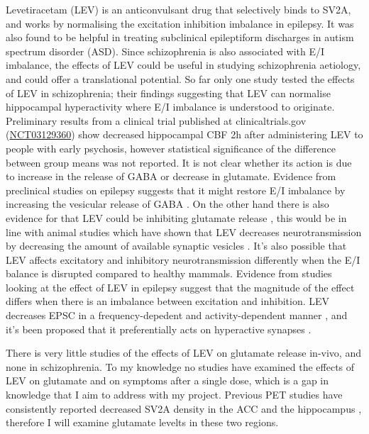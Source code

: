 \documentclass[
  letterpaper,
  DIV=11,
  numbers=noendperiod]{scrartcl}
\begin{document}
Levetiracetam (LEV) is an anticonvulsant drug that selectively binds to
SV2A, and works by normalising the excitation inhibition imbalance in
epilepsy. It was also found to be helpful in treating subclinical
epileptiform discharges in autism spectrum disorder
(ASD)\autocite{wang_levetiracetam_2017}. Since schizophrenia is also
associated with E/I imbalance, the effects of LEV could be useful in
studying schizophrenia aetiology, and could offer a translational
potential. So far only one study tested the effects of LEV in
schizophrenia; their findings suggesting that LEV can normalise
hippocampal hyperactivity \autocite{roeske_modulation_2023} where E/I
imbalance is understood to originate. Preliminary results from a
clinical trial published at clinicaltrials.gov
(\href{https://clinicaltrials.gov/study/NCT03129360}{NCT03129360})\autocite{goff_levetiracetam_2020}
show decreased hippocampal CBF 2h after administering LEV to people with
early psychosis, however statistical significance of the difference
between group means was not reported. It is not clear whether its action
is due to increase in the release of GABA or decrease in
glutamate\autocite{contreras-garcia_levetiracetam_2022}. Evidence from
preclinical studies on epilepsy suggests that it might restore E/I
imbalance by increasing the vesicular release of GABA
\autocite{luzadriana_effect_2018}. On the other hand there is also
evidence for that LEV could be inhibiting glutamate release
\autocite{contreras-garcia_synaptic_2021,meehan_levetiracetam_2012,yang_prolonged_2007,lee_levetiracetam_2009},
this would be in line with animal studies which have shown that LEV
decreases neurotransmission by decreasing the amount of available
synaptic vesicles \autocite{meehan_new_2011}. It's also possible that
LEV affects excitatory and inhibitory neurotransmission differently when
the E/I balance is disrupted compared to healthy mammals. Evidence from
studies looking at the effect of LEV in epilepsy suggest that the
magnitude of the effect differs when there is an imbalance between
excitation and inhibition. LEV decreases EPSC in a frequency-depedent
and activity-dependent manner \autocite{meehan_levetiracetam_2012}, and
it's been proposed that it preferentially acts on hyperactive synapses
\autocite{meehan_new_2011,loscher_synaptic_2016}.

There is very little studies of the effects of LEV on glutamate release
in-vivo, and none in schizophrenia. To my knowledge no studies have
examined the effects of LEV on glutamate and on symptoms after a single
dose, which is a gap in knowledge that I aim to address with my project.
Previous PET studies have consistently reported decreased SV2A density
in the ACC and the hippocampus
\autocite{radhakrishnan_vivo_2021,onwordi_synaptic_2020}, therefore I
will examine glutamate levelts in these two regions.
\end{document}
